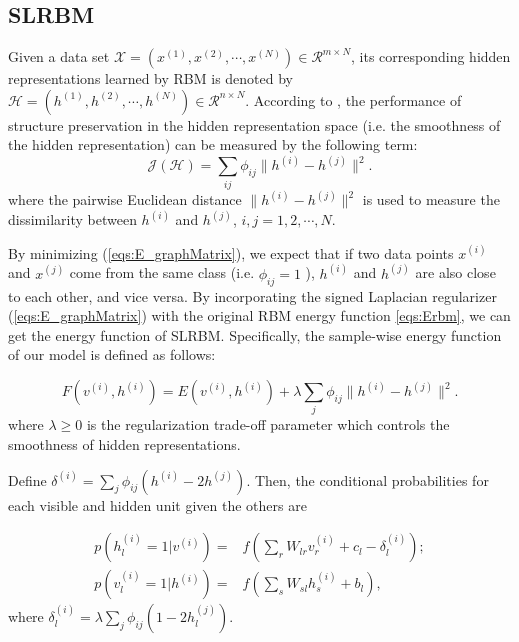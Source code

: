 \documentclass[a4paper,10pt,twocolumn]{article}
\newcommand{\eR}{\mathcal{R}}
\begin{document}
\subsection{SLRBM}
Given a data set $\mathcal{X} = \left(x^{(1)}, x^{(2)},\cdots,x^{(N)}\right)\in \eR^{m\times N}$, its corresponding hidden representations learned by RBM is denoted by $\mathcal{H} = (h^{(1)},h^{(2)},\cdots,h^{(N)})\in\eR^{n \times N}$. According to \cite{dongdong2018graph}, the performance of structure preservation in the hidden representation space (i.e. the smoothness of the hidden representation) can be measured by the following term:
\begin{equation}\label{eqs:E_graphMatrix}
\mathcal{J}(\mathcal{H}) = \sum\limits_{ij}\phi_{ij}\|h^{(i)} - h^{(j)}\|^2.
\end{equation}
where the pairwise Euclidean distance $\|h^{(i)} - h^{(j)}\|^2$ is used to measure the dissimilarity between $h^{(i)}$ and $h^{(j)}$, $i,j=1,2,\cdots,N$.

By minimizing (\ref{eqs:E_graphMatrix}), we expect that if two data points $x^{(i)}$ and $x^{(j)}$ come from the same class (i.e. $\phi_{ij}=1$ ), $h^{(i)}$ and $h^{(j)}$ are also close to each other, and vice versa. By incorporating the signed Laplacian regularizer (\ref{eqs:E_graphMatrix}) with the original RBM energy function \ref{eqs:Erbm}, we can get the energy function of SLRBM. Specifically, the sample-wise energy function of our model is defined as follows:

\begin{equation}\label{eqs:E_GraphRBMfull}
F(v^{(i)},h^{(i)}) = E(v^{(i)},h^{(i)}) + \lambda\sum_{j}\phi_{ij}\|h^{(i)} - h^{(j)}\|^2.
\end{equation}
where $\lambda \geq 0$ is the regularization trade-off parameter which controls the smoothness of hidden representations.

Define $\delta^{(i)}=\sum_{j}\phi_{ij}(h^{(i)}-2h^{(j)})$. Then, the conditional probabilities for each visible and hidden unit given the others are

\begin{align}
p(h_{l}^{(i)}=1|v^{(i)})  =& f ( \sum\limits_{r} W_{lr}v_{r}^{(i)} + c_l -  \delta_{l}^{(i)});\label{eqs:P_HV_graphRBM}\\
 p(v_{l}^{(i)}=1|h^{(i)}) =& f ( \sum\limits_{s} W_{sl}h_{s}^{(i)} + b_l ),\label{eqs:P_VH_graphRBM}
\end{align}
where $\delta_{l}^{(i)} = \lambda \sum_{j}\phi_{ij}(1-2h_{l}^{(j)})$.
\end{document}
